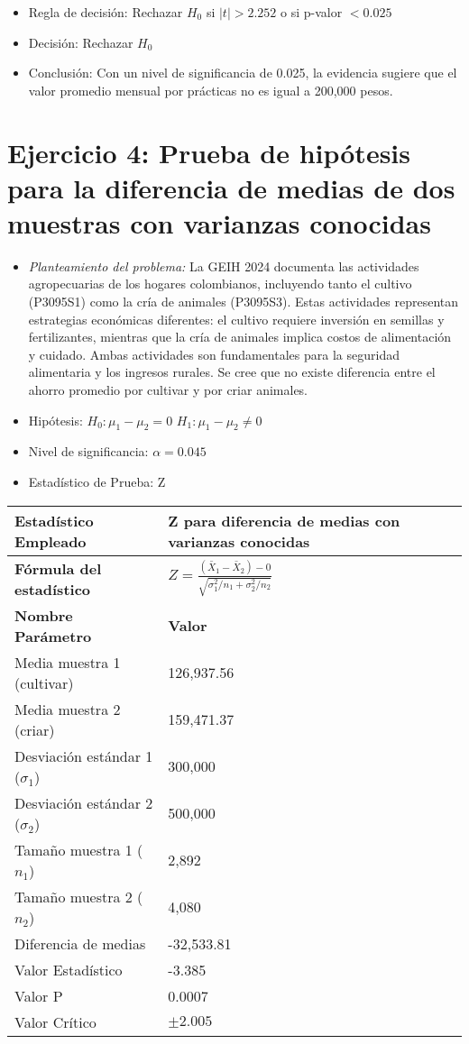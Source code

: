 \documentclass[12pt,a4paper]{article}
\begin{document}
\begin{itemize}
    \item Regla de decisión: Rechazar $H_0$ si $|t| > 2.252$ o si p-valor $< 0.025$
    \item Decisión: Rechazar $H_0$
    \item Conclusión: Con un nivel de significancia de 0.025, la evidencia sugiere que el valor promedio mensual por prácticas no es igual a 200,000 pesos.
\end{itemize}

\section*{Ejercicio 4: Prueba de hipótesis para la diferencia de medias de dos muestras con varianzas conocidas}
\begin{itemize}
    \item \textit{Planteamiento del problema:} La GEIH 2024 documenta las actividades agropecuarias de los hogares colombianos, incluyendo tanto el cultivo (P3095S1) como la cría de animales (P3095S3). Estas actividades representan estrategias económicas diferentes: el cultivo requiere inversión en semillas y fertilizantes, mientras que la cría de animales implica costos de alimentación y cuidado. Ambas actividades son fundamentales para la seguridad alimentaria y los ingresos rurales. Se cree que no existe diferencia entre el ahorro promedio por cultivar y por criar animales.
    \item Hipótesis: \quad $H_{0}: \mu_1 - \mu_2 = 0$ \hspace{2cm} $H_{1}: \mu_1 - \mu_2 \neq 0$
    \item Nivel de significancia: $\alpha = 0.045$
    \item Estadístico de Prueba: Z
\end{itemize}

\begin{tabular}{|m{7cm}|m{7cm}|}
\hline
\textbf{Estadístico Empleado} & Z para diferencia de medias con varianzas conocidas \\ \hline
\textbf{Fórmula del estadístico} & $Z = \frac{(\bar{X}_1 - \bar{X}_2) - 0}{\sqrt{\sigma_1^2/n_1 + \sigma_2^2/n_2}}$ \\ \hline
\textbf{Nombre Parámetro} & \textbf{Valor} \\ \hline
Media muestra 1 (cultivar) & 126,937.56 \\ \hline
Media muestra 2 (criar) & 159,471.37 \\ \hline
Desviación estándar 1 ($\sigma_1$) & 300,000 \\ \hline
Desviación estándar 2 ($\sigma_2$) & 500,000 \\ \hline
Tamaño muestra 1 ($n_1$) & 2,892 \\ \hline
Tamaño muestra 2 ($n_2$) & 4,080 \\ \hline
Diferencia de medias & -32,533.81 \\ \hline
Valor Estadístico & -3.385 \\ \hline
Valor P & 0.0007 \\ \hline
Valor Crítico & $\pm 2.005$ \\ \hline
\end{tabular}
\end{document}
